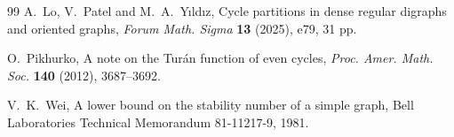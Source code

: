 \documentclass[11pt,a4paper]{article}
\theoremstyle{remark}
\numberwithin{equation}{section}
\begin{document}
\begin{thebibliography}{99}
		A.~Lo, V.~Patel and M.~A.~Y\i ld\i z,
		Cycle partitions in dense regular digraphs and oriented graphs,
		\emph{Forum Math. Sigma} \textbf{13} (2025), e79, 31 pp.
				
		O.~Pikhurko,
		A note on the Tur\'an function of even cycles,
		\emph{Proc. Amer. Math. Soc.} \textbf{140} (2012), 3687--3692.
		
		V.~K.~Wei,
		A lower bound on the stability number of a simple graph,
		Bell Laboratories Technical Memorandum 81-11217-9, 1981.
			


	\end{thebibliography}
\end{document}
